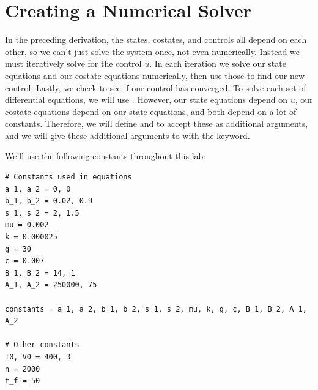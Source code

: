 \section*{Creating a Numerical Solver}

In the preceding derivation, the states, costates, and controls all depend on each other, so we can't just solve the system once, not even numerically.
Instead we must iteratively solve for the control $u$.
In each iteration we solve our state equations and our costate equations numerically, then use those to find our new control.
Lastly, we check to see if our control has converged.
To solve each set of differential equations, we will use .
However, our state equations depend on $u$, our costate equations depend on our state equations, and both depend on a lot of constants.
Therefore, we will define  and  to accept these as additional arguments, and we will give these additional arguments to  with the  keyword.

We'll use the following constants throughout this lab:

\begin{lstlisting}
# Constants used in equations
a_1, a_2 = 0, 0
b_1, b_2 = 0.02, 0.9
s_1, s_2 = 2, 1.5
mu = 0.002
k = 0.000025
g = 30
c = 0.007
B_1, B_2 = 14, 1
A_1, A_2 = 250000, 75

constants = a_1, a_2, b_1, b_2, s_1, s_2, mu, k, g, c, B_1, B_2, A_1, A_2

# Other constants
T0, V0 = 400, 3
n = 2000
t_f = 50
\end{lstlisting}

